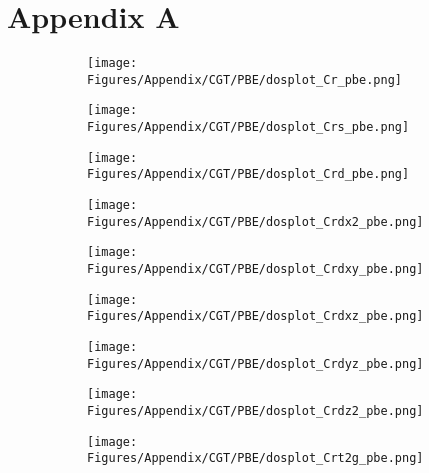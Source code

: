 \chapter{Appendix A} %
\vspace{-2.5cm}
\begin{figure}[H]
\centering
\begin{subfigure}{0.24\textwidth}
    \centering
    \texttt{[image: Figures/Appendix/CGT/PBE/dosplot\_Cr\_pbe.png]}
    \label{dosplot_Cr_pbe}
\end{subfigure}
\hfill
\begin{subfigure}{0.24\textwidth}
\centering
    \texttt{[image: Figures/Appendix/CGT/PBE/dosplot\_Crs\_pbe.png]}
    \label{dosplot_Crs_pbe}
\end{subfigure}
\hfill
\begin{subfigure}{0.24\textwidth}
    \texttt{[image: Figures/Appendix/CGT/PBE/dosplot\_Crd\_pbe.png]}
    \label{dosplot_Crd_pbe}
\end{subfigure}
\hfill
\begin{subfigure}{0.24\textwidth}
    \texttt{[image: Figures/Appendix/CGT/PBE/dosplot\_Crdx2\_pbe.png]}
    \label{dodosplot_Crdx2_pbe}
\end{subfigure}
\hfill
\begin{subfigure}{0.24\textwidth}
    \texttt{[image: Figures/Appendix/CGT/PBE/dosplot\_Crdxy\_pbe.png]}
    \label{dosplot_Crdxy_pbe}
\end{subfigure}
\hfill
\begin{subfigure}{0.24\textwidth}
    \texttt{[image: Figures/Appendix/CGT/PBE/dosplot\_Crdxz\_pbe.png]}
    \label{dosplot_Crdxz_pbe}
\end{subfigure}
\hfill
\begin{subfigure}{0.24\textwidth}
    \texttt{[image: Figures/Appendix/CGT/PBE/dosplot\_Crdyz\_pbe.png]}
    \label{dosplot_Crdyz_pbe}
\end{subfigure}
\hfill
\begin{subfigure}{0.24\textwidth}
    \texttt{[image: Figures/Appendix/CGT/PBE/dosplot\_Crdz2\_pbe.png]}
    \label{dosplot_Crdz2_pbe}
\end{subfigure}
\hfill
\begin{subfigure}{0.24\textwidth}
    \texttt{[image: Figures/Appendix/CGT/PBE/dosplot\_Crt2g\_pbe.png]}

\end{subfigure}
\end{figure}
